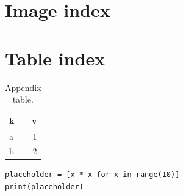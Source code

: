 \expandafter\documentclass\expandafter[\tfglang]{utad-tfg}
\begin{document}
\section{Image index}
\tfgimageindex

\section{Table index}
\tfgtableindex

\begin{tfgglossary}
\begin{tfgglosslist}
 \lipsum[110][1]
 \lipsum[110][2]
 \lipsum[110][3]
 \lipsum[110][4]
 \lipsum[111][1]
 \lipsum[111][2]
 \lipsum[111][3]
 \lipsum[111][4]
 \lipsum[112][1]
 \lipsum[112][2]
 \lipsum[112][3]
 \lipsum[112][4]
\end{tfgglosslist}
\end{tfgglossary}

\begin{tfgappendix}
\lipsum[113-114]

\begin{table}[H]
  \centering
  \caption{Appendix table. }
  \begin{tabular}{lr}
    \toprule
    k & v \\
    \midrule
    a & 1 \\
    b & 2 \\
    \bottomrule
  \end{tabular}
\end{table}

\begin{lstlisting}[caption={Appendix listing.}]
placeholder = [x * x for x in range(10)]
print(placeholder)
\end{lstlisting}

\lipsum[115-120]
\end{tfgappendix}
\end{document}
